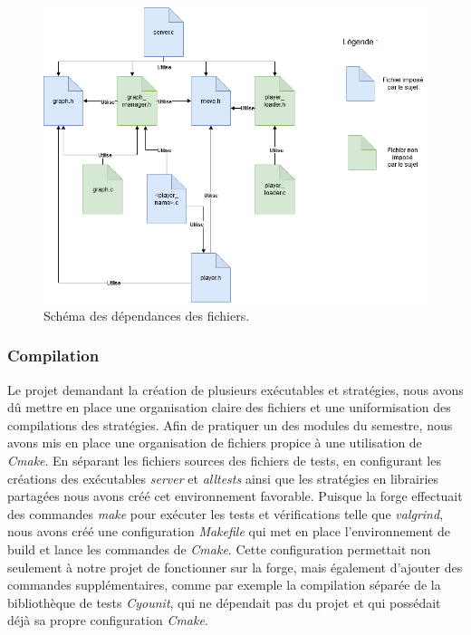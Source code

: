 \documentclass[a4paper, 12pt]{article}
\begin{document}
\begin{figure}[h]
  \centering
  \includegraphics[width=.9\linewidth]{./pictures/dependencie.png}
  \caption{Schéma des dépendances des fichiers.}
  \label{fig:dep}
\end{figure}

\subsubsection{Compilation}
Le projet demandant la création de plusieurs exécutables et stratégies, nous avons dû mettre en place une organisation claire des fichiers et une uniformisation des compilations des stratégies. Afin de pratiquer un des modules du semestre, nous avons mis en place une organisation de fichiers propice à une utilisation de \emph{Cmake}.  En séparant les fichiers sources des fichiers de tests, en configurant les créations des exécutables \emph{server} et \emph{alltests} ainsi que les stratégies en librairies partagées nous avons créé cet environnement favorable. Puisque la forge effectuait des commandes \emph{make} pour exécuter les tests et vérifications telle que \emph{valgrind}, nous avons créé une configuration \emph{Makefile} qui met en place l'environnement de build et lance les commandes de \emph{Cmake}. Cette configuration permettait non seulement à notre projet de fonctionner sur la forge, mais également d'ajouter des commandes supplémentaires, comme par exemple la compilation séparée de la bibliothèque de tests \emph{Cyounit}, qui ne dépendait pas du projet et qui possédait déjà sa propre configuration \emph{Cmake}.
\end{document}
